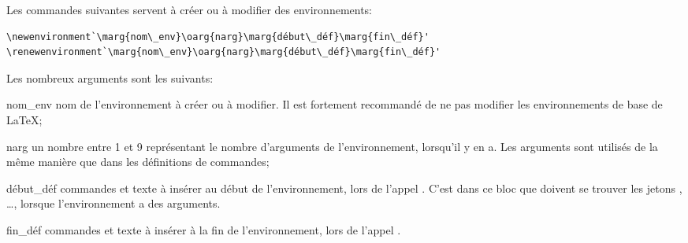 Les commandes suivantes servent à créer ou à modifier des
environnements:
\begin{lstlisting}
\newenvironment`\marg{nom\_env}\oarg{narg}\marg{début\_déf}\marg{fin\_déf}'
\renewenvironment`\marg{nom\_env}\oarg{narg}\marg{début\_déf}\marg{fin\_déf}'
\end{lstlisting}
Les nombreux arguments sont les suivants:
\begin{list}{}{%
    \setlength{\labelsep}{1.5ex}
    \setlength{\leftmargin}{\labelwidth}
    \addtolength{\leftmargin}{\labelsep}
    \setlength{\parsep}{0.5ex plus0.2ex minus0.2ex}
    \setlength{\itemsep}{0.3ex}
    \renewcommand{\makelabel}[1]{\meta{#1}\hfill}}
%

\item[nom\_env] nom de l'environnement à créer ou à modifier.
  Il est fortement recommandé de ne pas modifier les environnements de
  base de {\LaTeX};
\item[narg] un nombre entre 1 et 9 représentant le nombre
  d'arguments de l'environnement, lorsqu'il y en a. Les arguments sont
  utilisés de la même manière que dans les définitions de commandes;
\item[début\_déf] commandes et texte à insérer au début de
  l'environnement, lors de l'appel .
  C'est dans ce bloc que doivent se trouver les jetons ,
  \dots, \code{\#} lorsque l'environnement a des
  arguments.
\item[fin\_déf] commandes et texte à insérer à la fin de
  l'environnement, lors de l'appel .
  \end{list}

